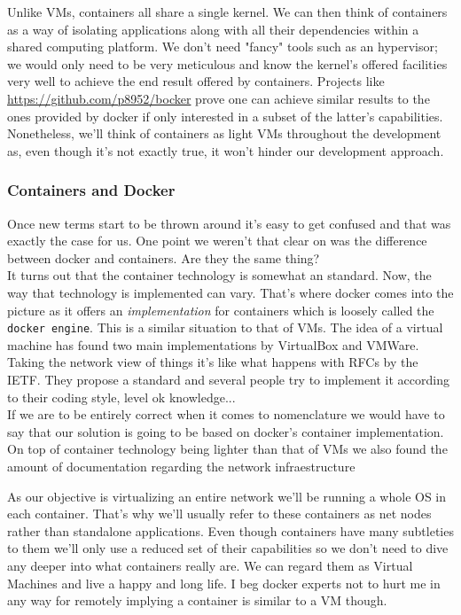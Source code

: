             Unlike VMs, containers all share a single kernel. We can then think of containers as a way of isolating applications along with all their dependencies within a shared computing platform. We don't need "fancy" tools such as an hypervisor; we would only need to be very meticulous and know the kernel's offered facilities very well to achieve the end result offered by containers. Projects like \href{bocker}{https://github.com/p8952/bocker} prove one can achieve similar results to the ones provided by docker if only interested in a subset of the latter's capabilities. Nonetheless, we'll think of containers as light VMs throughout the development as, even though it's not exactly true, it won't hinder our development approach.\\

            \subsubsection{Containers and Docker}
                Once new terms start to be thrown around it's easy to get confused and that was exactly the case for us. One point we weren't that clear on was the difference between docker and containers. Are they the same thing?\\

                It turns out that the container technology is somewhat an standard. Now, the way that technology is implemented can vary. That's where docker comes into the picture as it offers an \textit{implementation} for containers which is loosely called the \texttt{docker engine}. This is a similar situation to that of VMs. The idea of a virtual machine has found two main implementations by VirtualBox and VMWare. Taking the network view of things it's like what happens with RFCs by the IETF. They propose a standard and several people try to implement it according to their coding style, level ok knowledge...\\

                If we are to be entirely correct when it comes to nomenclature we would have to say that our solution is going to be based on docker's container implementation.\\

            On top of container technology being lighter than that of VMs we also found the amount of documentation regarding the network infraestructure

             As our objective is virtualizing an entire network we'll be running a whole OS in each container. That's why we'll usually refer to these containers as net nodes rather than standalone applications. Even though containers have many subtleties to them we'll only use a reduced set of their capabilities so we don't need to dive any deeper into what containers really are. We can regard them as Virtual Machines and live a happy and long life. I beg docker experts not to hurt me in any way for remotely implying a container is similar to a VM though.